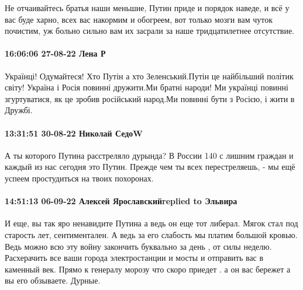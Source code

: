 Не отчаивайтесь братья наши меньшие, Путин приде и порядок наведе, и всё у вас
буде харно, всех вас накормим и обогреем, вот только мозги вам чуток почистим,
уж больно сильно вам их засрали за наше тридцатилетнее отсутствие.

\paragraph{16:06:06 27-08-22 Лена Р}

Українці! Одумайтеся! Хто Путін а хто Зеленський.Путін це найбільший політик
світу! Україна і Росія повинні дружити.Ми братні народи! Ми українці повинні
згуртуватися, як це зробив російський народ.Ми повинні бути з Росією, і жити в
Дружбі.

\paragraph{13:31:51 30-08-22 Николай СедоW}

А ты которого Путина расстреляло дурында? В России 140 с лишним граждан и каждый из нас сегодня это Путин. Прежде чем ты всех перестреляешь, - мы ещё успеем простудиться на твоих похоронах.

\paragraph{14:51:13 06-09-22 Алексей Ярославскийreplied to Эльвира}

И еще, вы так яро ненавидите Путина а ведь он еще тот либерал. Мягок стал под
старость лет, сентиментален. А ведь за его слабость мы платим большой кровью.
Ведь можно всю эту войну закончить буквально за день , от силы неделю.
Расхерачить все ваши города электростанции и мосты и отправить вас в каменный
век. Прямо к генералу морозу что скоро приедет . а он вас бережет а вы его
обзываете. Дурные.










